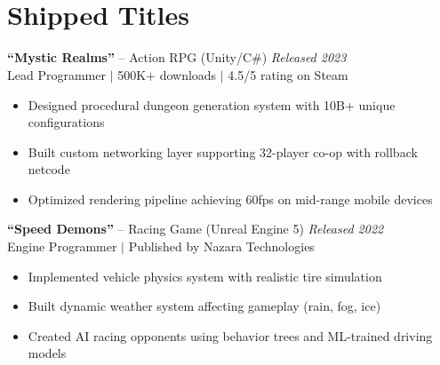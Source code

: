 \documentclass[10pt,letterpaper]{article}
\begin{document}
\noindent{}

\vspace{-1.2cm}
\\[2pt]
\\[2pt]

\vspace{1.2cm}

\section{Shipped Titles}
\textbf{``Mystic Realms''} -- Action RPG (Unity/C\#) \hfill \textit{Released 2023}\\
{\small Lead Programmer $\vert$ 500K+ downloads $\vert$ 4.5/5 rating on Steam}
\begin{itemize}
\item Designed procedural dungeon generation system with 10B+ unique configurations
\item Built custom networking layer supporting 32-player co-op with rollback netcode
\item Optimized rendering pipeline achieving 60fps on mid-range mobile devices
\end{itemize}

\textbf{``Speed Demons''} -- Racing Game (Unreal Engine 5) \hfill \textit{Released 2022}\\
{\small Engine Programmer $\vert$ Published by Nazara Technologies}
\begin{itemize}
\item Implemented vehicle physics system with realistic tire simulation
\item Built dynamic weather system affecting gameplay (rain, fog, ice)
\item Created AI racing opponents using behavior trees and ML-trained driving models
\end{itemize}
\end{document}
